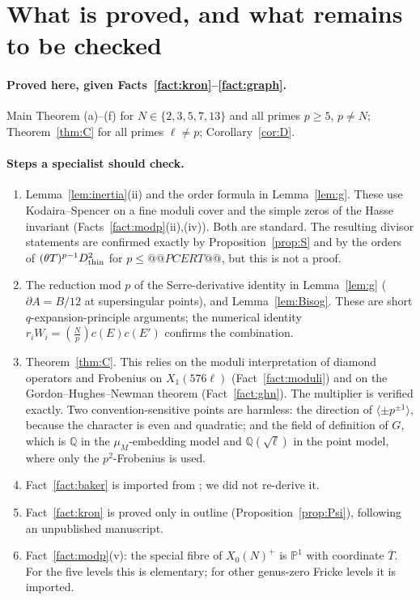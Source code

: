 \documentclass[11pt,a4paper]{article}
\numberwithin{equation}{section}
\theoremstyle{definition}
\theoremstyle{remark}
\newcommand{\Q}{\mathbb Q}
\newcommand{\Lp}[1]{\left(\frac{#1}{p}\right)}
\begin{document}
\section{What is proved, and what remains to be checked}\label{sec:status}
\paragraph{Proved here, given Facts~\ref{fact:kron}--\ref{fact:graph}.} Main Theorem (a)--(f) for
$N\in\{2,3,5,7,13\}$ and all primes $p\ge5$, $p\ne N$; Theorem~\ref{thm:C} for all primes $\ell\ne p$;
Corollary~\ref{cor:D}.

\paragraph{Steps a specialist should check.}
\begin{enumerate}[label=(U\arabic*)]
\item Lemma~\ref{lem:inertia}(ii) and the order formula in Lemma~\ref{lem:g}. These use Kodaira--Spencer on a
fine moduli cover and the simple zeros of the Hasse invariant (Facts~\ref{fact:modp}(ii),(iv)). Both
are standard. The resulting divisor statements are confirmed exactly by Proposition~\ref{prop:S} and
by the orders of $(\theta T)^{p-1}D_{\rm thin}^2$ for $p\le @@PCERT@@$, but this is not a proof.
\item The reduction mod $p$ of the Serre-derivative identity in Lemma~\ref{lem:g} ($\partial A=B/12$
at supersingular points), and Lemma~\ref{lem:Bisog}. These are short $q$-expansion-principle
arguments; the numerical identity $r_iW_i=\Lp Nc(E)c(E')$ confirms the combination.
\item Theorem~\ref{thm:C}. This relies on the moduli interpretation of diamond operators and Frobenius
on $X_1(576\ell)$ (Fact~\ref{fact:moduli}) and on the Gordon--Hughes--Newman theorem
(Fact~\ref{fact:ghn}). The multiplier is verified exactly. Two convention-sensitive points are harmless: the
direction of $\langle\pm p^{\pm1}\rangle$, because the character is even and quadratic; and the field of definition of
$G$, which is $\Q$ in the $\mu_M$-embedding model and $\Q(\sqrt\ell)$ in the point model, where only the $p^2$-Frobenius is used.
\item Fact~\ref{fact:baker} is imported from \citet{Baker98}; we did not re-derive it.
\item Fact~\ref{fact:kron} is proved only in outline (Proposition~\ref{prop:Psi}), following an unpublished manuscript.
\item Fact~\ref{fact:modp}(v): the special fibre of $X_0(N)^+$ is $\mathbb P^1$ with coordinate $\overline T$. For the five
levels this is elementary; for other genus-zero Fricke levels it is imported.
\end{enumerate}
\end{document}
